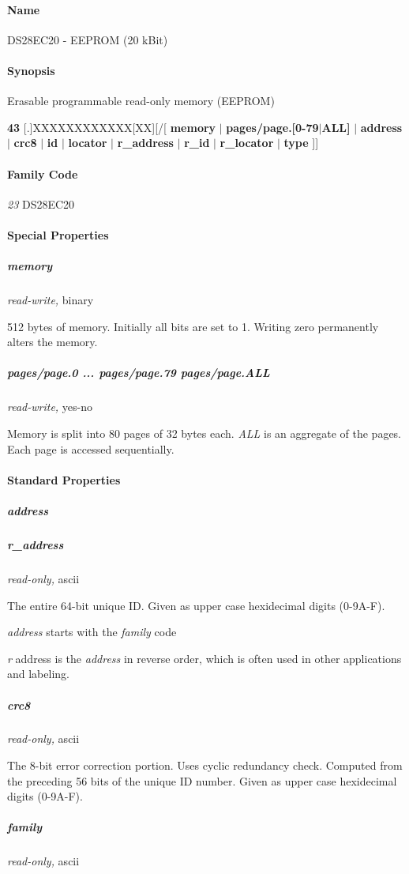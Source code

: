 \paragraph*{Name}
DS28EC20 - EEPROM (20 kBit) 
\paragraph*{Synopsis}
Erasable programmable
read-only memory (EEPROM) 

\textbf{43} [.]XXXXXXXXXXXX[XX][/[ \textbf{memory} $|$ \textbf{pages/page.[0-79$|$ALL]}
$|$           \textbf{address} $|$ \textbf{crc8} $|$ \textbf{id} $|$ \textbf{locator} $|$ \textbf{r\_address} $|$ \textbf{r\_id} $|$ \textbf{r\_locator} $|$ \textbf{type}
 ]] 
\paragraph*{Family Code}


\textit{23} DS28EC20 
\paragraph*{Special Properties}

\subparagraph*{memory}\textit{read-write,} binary 

512 bytes of memory. Initially all bits are set to 1. Writing zero permanently
alters the memory. 
\subparagraph*{pages/page.0 ... pages/page.79 pages/page.ALL}\textit{read-write,} yes-no


Memory is split into 80 pages of 32 bytes each. \textit{ALL} is an aggregate of the
pages. Each page is accessed sequentially. 
\paragraph*{Standard Properties}
          
\subparagraph*{address}
\subparagraph*{r\_address}\textit{read-only,}
ascii 

The entire 64-bit unique ID. Given as upper case hexidecimal digits (0-9A-F).


\textit{address} starts with the \textit{family} code 

\textit{r} address is the \textit{address} in reverse order, which is often used in other
applications and labeling. 
\subparagraph*{crc8}\textit{read-only,} ascii 

The 8-bit error correction portion. Uses cyclic redundancy check. Computed
from the preceding 56 bits of the unique ID number. Given as upper case
hexidecimal digits (0-9A-F). 
\subparagraph*{family}\textit{read-only,} ascii 

